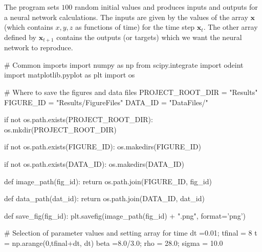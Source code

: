 \documentclass[%
oneside,                 %
final,                   %
10pt]{article}
\begin{document}
The program sets $100$ random initial values and produces inputs and outputs for a neural network calculations.
The inputs are given by the values of the array $\bm{x}$ (which contains $x,y,z$ as functions of time) for the time step $\bm{x}_t$.
The other array defined by $\bm{x}_{t+1}$ contains the outputs (or targets) which we want the neural network to reproduce.


























































\bpycod
# Common imports
import numpy as np
from scipy.integrate import odeint
import matplotlib.pyplot as plt
import os

# Where to save the figures and data files
PROJECT_ROOT_DIR = "Results"
FIGURE_ID = "Results/FigureFiles"
DATA_ID = "DataFiles/"

if not os.path.exists(PROJECT_ROOT_DIR):
    os.mkdir(PROJECT_ROOT_DIR)

if not os.path.exists(FIGURE_ID):
    os.makedirs(FIGURE_ID)

if not os.path.exists(DATA_ID):
    os.makedirs(DATA_ID)

def image_path(fig_id):
    return os.path.join(FIGURE_ID, fig_id)

def data_path(dat_id):
    return os.path.join(DATA_ID, dat_id)

def save_fig(fig_id):
    plt.savefig(image_path(fig_id) + ".png", format='png')


# Selection of parameter values and setting array for time
dt =0.01; tfinal = 8
t = np.arange(0,tfinal+dt, dt)
beta =8.0/3.0; rho = 28.0; sigma = 10.0
\end{document}
